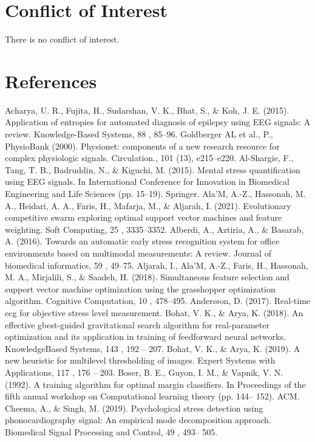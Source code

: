 \section{Conflict of Interest}

There is no conflict of interest.

\section{References}

Acharya, U. R., Fujita, H., Sudarshan, V. K., Bhat, S., \& Koh, J. E. (2015). Application of entropies for automated diagnosis of epilepsy using EEG signals: A review. Knowledge-Based Systems, 88 , 85–96.
Goldberger AL et al., P., PhysioBank (2000). Physionet: components of a new research resource for complex physiologic signals. Circulation., 101 (13), e215–e220.
Al-Shargie, F., Tang, T. B., Badruddin, N., \& Kiguchi, M. (2015). Mental stress quantification using EEG signals. In International Conference for Innovation in Biomedical Engineering and Life Sciences (pp. 15–19). Springer.
Ala’M, A.-Z., Hassonah, M. A., Heidari, A. A., Faris, H., Mafarja, M., \& Aljarah, I. (2021). Evolutionary competitive swarm exploring optimal support vector machines and feature weighting. Soft Computing, 25 , 3335–3352.
Alberdi, A., Aztiria, A., \& Basarab, A. (2016). Towards an automatic early stress recognition system for office environments based on multimodal measurements: A review. Journal of biomedical informatics, 59 , 49–75.
Aljarah, I., Ala’M, A.-Z., Faris, H., Hassonah, M. A., Mirjalili, S., \& Saadeh, H. (2018). Simultaneous feature selection and support vector machine optimization using the grasshopper optimization algorithm. Cognitive Computation, 10 , 478–495.
Andersson, D. (2017). Real-time ecg for objective stress level measurement.
Bohat, V. K., \& Arya, K. (2018). An effective gbest-guided gravitational search algorithm for real-parameter optimization and its application in training of feedforward neural networks. KnowledgeBased Systems, 143 , 192 – 207.
Bohat, V. K., \& Arya, K. (2019). A new heuristic for multilevel thresholding of images. Expert Systems with Applications, 117 , 176 – 203.
Boser, B. E., Guyon, I. M., \& Vapnik, V. N. (1992). A training algorithm for optimal margin classifiers. In Proceedings of the fifth annual workshop on Computational learning theory (pp. 144– 152). ACM.
Cheema, A., \& Singh, M. (2019). Psychological stress detection using phonocardiography signal: An empirical mode decomposition approach. Biomedical Signal Processing and Control, 49 , 493– 505.
